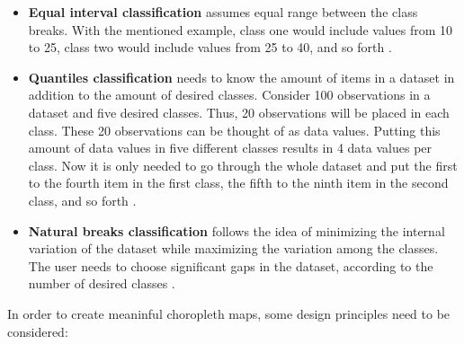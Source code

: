 \begin{itemize}

\item \textbf{Equal interval classification} assumes equal range between the class breaks. With the mentioned example, class one would include values from 10 to 25, class two would include values from 25 to 40, and so forth .

\item \textbf{Quantiles classification} needs to know the amount of items in a dataset in addition to the amount of desired classes. Consider 100 observations in a dataset and five desired classes. Thus, 20 observations will be placed in each class. These 20 observations can be thought of as data values. Putting this amount of data values in five different classes results in 4 data values per class. Now it is only needed to go through the whole dataset and put the first to the fourth item in the first class, the fifth to the ninth item in the second class, and so forth .

\item \textbf{Natural breaks classification} follows the idea of minimizing the internal variation of the dataset while maximizing the variation among the classes. The user needs to choose significant gaps in the dataset, according to the number of desired classes .

\end{itemize}

In order to create meaninful choropleth maps, some design principles need to be considered:

